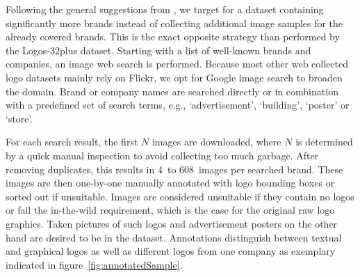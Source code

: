 \documentclass[a4paper,twoside]{article}
\newcommand{\xeg}{e.g.}
\begin{document}
%
Following the general suggestions from \cite{bansal2017}, we target for a dataset containing significantly more brands instead of collecting additional image samples for the already covered brands. This is the exact opposite strategy than performed by the Logos-32plus dataset.
Starting with a list of well-known brands and companies, an image web search is performed. Because most other web collected logo datasets mainly rely on Flickr, we opt for Google image search to broaden the domain. Brand or company names are searched directly or in combination with a predefined set of search terms, \xeg, `advertisement', `building', `poster' or `store'. 

For each search result, the first $N$ images are downloaded, where $N$ is determined by a quick manual inspection to avoid collecting too much garbage. 
After removing duplicates, this results in 4~to 608~images per searched brand. These images are then one-by-one manually annotated with logo bounding boxes or sorted out if unsuitable.
Images are considered unsuitable if they contain no logos or fail the in-the-wild requirement, which is the case for the original raw logo graphics. Taken pictures of such logos and advertisement posters on the other hand are desired to be in the dataset. 
Annotations distinguish between textual and graphical logos as well as different logos from one company as exemplary indicated in figure~\ref{fig:annotatedSample}.
%
\end{document}
